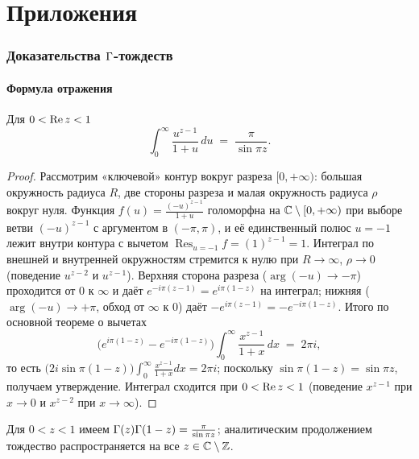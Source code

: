 \appendix

\part*{Приложения}

\section{Доказательства $\Gamma$-тождеств}\label{app:gamma}

\subsection{Формула отражения}

\begin{proposition}\label{prop:euler}
Для $0<\operatorname{Re} z<1$
\[
  \int_0^\infty \frac{u^{z-1}}{1+u}\,du \;=\; \frac{\pi}{\sin \pi z}.
\]
\end{proposition}

\begin{proof}
Рассмотрим «ключевой» контур вокруг разреза $[0,+\infty)$: большая
окружность радиуса $R$, две стороны разреза и малая окружность радиуса
$\rho$ вокруг нуля. Функция $f(u)=\frac{(-u)^{z-1}}{1+u}$ голоморфна
на $\mathbb{C}\setminus[0,+\infty)$ при выборе ветви $(-u)^{z-1}$ с
аргументом в $(-\pi,\pi)$, и её единственный полюс $u=-1$ лежит внутри
контура с вычетом $\operatorname{Res}_{u=-1}f=(1)^{z-1}=1$. Интеграл
по внешней и внутренней окружностям стремится к нулю при $R\to\infty$,
$\rho\to0$ (поведение $u^{z-2}$ и $u^{z-1}$). Верхняя сторона разреза
($\arg(-u)\to-\pi$) проходится от $0$ к $\infty$ и даёт
$e^{-i\pi(z-1)}=e^{i\pi(1-z)}$ на интеграл; нижняя
($\arg(-u)\to+\pi$, обход от $\infty$ к $0$) даёт
$-e^{i\pi(z-1)}=-e^{-i\pi(1-z)}$. Итого по основной теореме о вычетах
\[
  \bigl(e^{i\pi(1-z)}-e^{-i\pi(1-z)}\bigr)
  \int_0^\infty\frac{x^{z-1}}{1+x}\,dx \;=\;2\pi i,
\]
то есть $\bigl(2i\sin\pi(1-z)\bigr)
\int_0^\infty\frac{x^{z-1}}{1+x}dx=2\pi i$; поскольку
$\sin\pi(1-z)=\sin\pi z$, получаем утверждение. Интеграл сходится при
$0<\operatorname{Re} z<1$ (поведение $x^{z-1}$ при $x\to0$ и $x^{z-2}$ при
$x\to\infty$).
\end{proof}

\begin{proposition}\label{prop:reflection}
Для $0<z<1$ имеем $\Gamma(z)\Gamma(1-z)=\frac{\pi}{\sin\pi z}$;
аналитическим продолжением тождество распространяется на все
$z\in\mathbb{C}\setminus\mathbb{Z}$.
\end{proposition}

